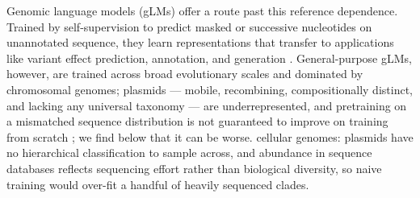 Genomic language models (gLMs) offer a route past this reference dependence.
Trained by self-supervision to predict masked or successive nucleotides on
unannotated sequence, they learn representations that transfer to
applications like variant effect prediction, annotation, and generation
\cite{benegas2023dna,nguyen2024sequence}. General-purpose gLMs, however, are
trained across broad evolutionary scales and dominated by chromosomal
genomes; plasmids --- mobile, recombining, compositionally distinct, and
lacking any universal taxonomy --- are underrepresented, and pretraining on a
mismatched sequence distribution is not guaranteed to improve on training from
scratch \cite{tang2025evaluating,patel2024dart,gu2022domain,zhang2023survey};
we find below that it can be worse.
cellular genomes: plasmids have no hierarchical classification to sample
across, and abundance in sequence databases reflects sequencing effort rather
than biological diversity, so naive training would over-fit a handful of
heavily sequenced clades.

